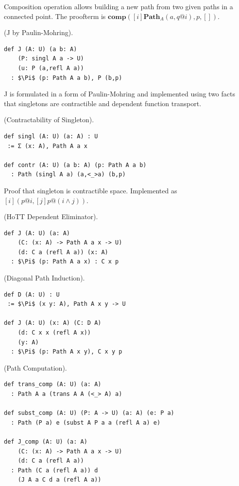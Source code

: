 \documentclass{article}
\begin{document}
Composition operation allows building a new path from two given paths
in a connected point. The proofterm is
$\mathbf{comp}([i] \mathbf{Path}_A(a,q@i),p,[])$.

\begin{theorem} (J by Paulin-Mohring).
\begin{lstlisting}[mathescape=true]
def J (A: U) (a b: A)
    (P: singl A a -> U)
    (u: P (a,refl A a))
  : $\Pi$ (p: Path A a b), P (b,p)
\end{lstlisting}
\end{theorem}

J is formulated in a form of Paulin-Mohring and implemented using
two facts that singletons are contractible and dependent function
transport.

\begin{theorem} (Contractability of Singleton).
\begin{lstlisting}[mathescape=true]
def singl (A: U) (a: A) : U
 := Σ (x: A), Path A a x

def contr (A: U) (a b: A) (p: Path A a b)
  : Path (singl A a) (a,<_>a) (b,p)
\end{lstlisting}
\end{theorem}

Proof that singleton is contractible space. Implemented as $[i] (p @ i, [j] p @ (i \land j))$.

\begin{theorem} (HoTT Dependent Eliminator).
\begin{lstlisting}[mathescape=true]
def J (A: U) (a: A)
    (C: (x: A) -> Path A a x -> U)
    (d: C a (refl A a)) (x: A)
  : $\Pi$ (p: Path A a x) : C x p
\end{lstlisting}
\end{theorem}

\begin{theorem} (Diagonal Path Induction).
\begin{lstlisting}[mathescape=true]
def D (A: U) : U
 := $\Pi$ (x y: A), Path A x y -> U

def J (A: U) (x: A) (C: D A)
    (d: C x x (refl A x))
    (y: A)
  : $\Pi$ (p: Path A x y), C x y p
\end{lstlisting}
\end{theorem}

\newpage
\begin{theorem} (Path Computation).
\begin{lstlisting}[mathescape=true]
def trans_comp (A: U) (a: A)
  : Path A a (trans A A (<_> A) a)

def subst_comp (A: U) (P: A -> U) (a: A) (e: P a)
  : Path (P a) e (subst A P a a (refl A a) e)

def J_comp (A: U) (a: A)
    (C: (x: A) -> Path A a x -> U)
    (d: C a (refl A a))
  : Path (C a (refl A a)) d
    (J A a C d a (refl A a))
\end{lstlisting}
\end{theorem}
\end{document}
